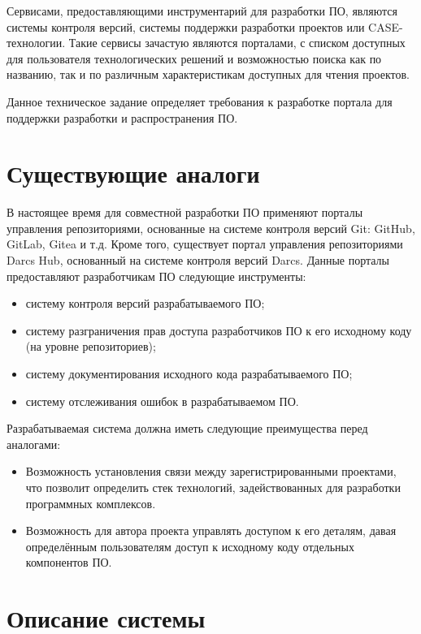 \documentclass{bmstu}
\begin{document}
  Сервисами, предоставляющими инструментарий для разработки ПО,
  являются системы контроля версий, системы поддержки разработки
  проектов или CASE-технологии.
  Такие сервисы зачастую являются порталами, с списком доступных для
  пользователя технологических решений и возможностью поиска как по
  названию, так и по различным характеристикам доступных для чтения
  проектов.

  Данное техническое задание определяет требования к разработке
  портала для поддержки разработки и распространения ПО.

  \section{Существующие аналоги}

  В настоящее время для совместной разработки ПО применяют порталы
  управления репозиториями, основанные на системе контроля версий Git:
  GitHub, GitLab, Gitea и т.д.
  Кроме того, существует портал управления репозиториями Darcs Hub,
  основанный на системе контроля версий Darcs.
  Данные порталы предоставляют разработчикам ПО следующие инструменты:
  \begin{itemize}[label=---]
    \item систему контроля версий разрабатываемого ПО;
    \item систему разграничения прав доступа разработчиков ПО к его
      исходному коду (на уровне репозиториев);
    \item систему документирования исходного кода разрабатываемого ПО;
    \item систему отслеживания ошибок в разрабатываемом ПО.
  \end{itemize}

  Разрабатываемая система должна иметь следующие преимущества перед
  аналогами:
  \begin{itemize}[label=---]
    \item Возможность установления связи между зарегистрированными
      проектами, что позволит определить стек технологий,
      задействованных для разработки программных комплексов.
    \item Возможность для автора проекта управлять доступом к его
      деталям, давая определённым пользователям доступ к исходному
      коду отдельных компонентов ПО.
  \end{itemize}

  \section{Описание системы} \label{chapter:system-description}
\end{document}
